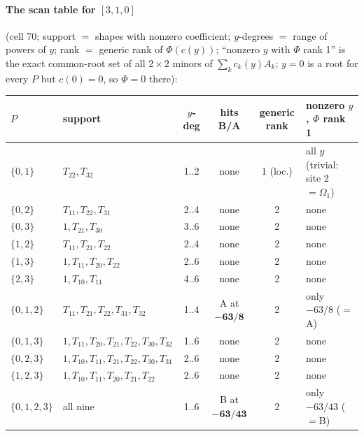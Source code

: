 \documentclass[11pt]{article}
\newcommand{\Om}{\Omega}
\newcommand{\Tt}[1]{T_{#1}}
\begin{document}
\paragraph{The scan table for $[3,1,0]$} (cell 70; support $=$ shapes with nonzero coefficient; $y$-degrees $=$ range of powers of $y$; rank $=$ generic rank of $\Phi(c(y))$; ``nonzero $y$ with $\Phi$ rank 1'' is the exact common-root set of all $2\times2$ minors of $\sum_kc_k(y)A_k$; $y=0$ is a root for every $P$ but $c(0)=0$, so $\Phi=0$ there):
\begin{center}\small
\begin{tabular}{@{}llcccl@{}}\toprule
$P$ & support & $y$-deg & hits B/A & generic rank & nonzero $y$, $\Phi$ rank 1\\\midrule
$\{0,1\}$ & $\Tt{22},\Tt{32}$ & 1..2 & none & 1 (loc.) & all $y$ (trivial: site 2 $=\Om_1$)\\
$\{0,2\}$ & $\Tt{11},\Tt{22},\Tt{31}$ & 2..4 & none & 2 & none\\
$\{0,3\}$ & $1,\Tt{21},\Tt{30}$ & 3..6 & none & 2 & none\\
$\{1,2\}$ & $\Tt{11},\Tt{21},\Tt{22}$ & 2..4 & none & 2 & none\\
$\{1,3\}$ & $1,\Tt{11},\Tt{20},\Tt{22}$ & 2..6 & none & 2 & none\\
$\{2,3\}$ & $1,\Tt{10},\Tt{11}$ & 4..6 & none & 2 & none\\
$\{0,1,2\}$ & $\Tt{11},\Tt{21},\Tt{22},\Tt{31},\Tt{32}$ & 1..4 & A at $\mathbf{-63/8}$ & 2 & only $-63/8$ ($=$A)\\
$\{0,1,3\}$ & $1,\Tt{11},\Tt{20},\Tt{21},\Tt{22},\Tt{30},\Tt{32}$ & 1..6 & none & 2 & none\\
$\{0,2,3\}$ & $1,\Tt{10},\Tt{11},\Tt{21},\Tt{22},\Tt{30},\Tt{31}$ & 2..6 & none & 2 & none\\
$\{1,2,3\}$ & $1,\Tt{10},\Tt{11},\Tt{20},\Tt{21},\Tt{22}$ & 2..6 & none & 2 & none\\
$\{0,1,2,3\}$ & all nine & 1..6 & B at $\mathbf{-63/43}$ & 2 & only $-63/43$ ($=$B)\\\bottomrule
\end{tabular}
\end{center}
\end{document}
